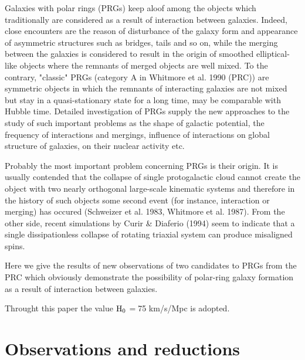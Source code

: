 Galaxies with polar rings (PRGs) keep aloof among the objects
which traditionally are considered as a result of interaction
between galaxies. Indeed, close encounters are the reason
of disturbance of the galaxy form and appearance of asymmetric
structures such as bridges, tails and so on, while the merging
between the galaxies is considered to result in the origin of
smoothed elliptical-like objects where the remnants of
merged objects are well mixed. To the contrary, "classic" PRGs
(category A in Whitmore et al. 1990 (PRC)) are symmetric
objects in which the remnants of interacting galaxies are not
mixed but stay in a quasi-stationary state for a
long time, may be comparable with Hubble time. Detailed
investigation of PRGs supply the new approaches to the study
of such important problems as the shape of galactic potential,
the frequency of interactions and mergings, influence of
interactions on global structure of galaxies, on their nuclear
activity etc.

Probably the most important problem concerning PRGs is their
origin. It is usually contended that the collapse of single
protogalactic cloud cannot create the object with two nearly
orthogonal large-scale kinematic systems and therefore in
the history of such objects some second event (for instance,
interaction or merging) has occured (Schweizer et al. 1983,
Whitmore et al. 1987). From the other side, recent simulations
by Curir \& Diaferio (1994) seem to indicate that a single
dissipationless collapse of rotating triaxial system can
produce misaligned spins.

Here we give the results of new observations of two candidates to
PRGs from the PRC which obviously demonstrate the possibility
of polar-ring galaxy formation as a result of interaction between 
galaxies.

Throught this paper the value $\rm H_{0}\,=\,$75 km/s/Mpc is
adopted.

\section{Observations and reductions}


